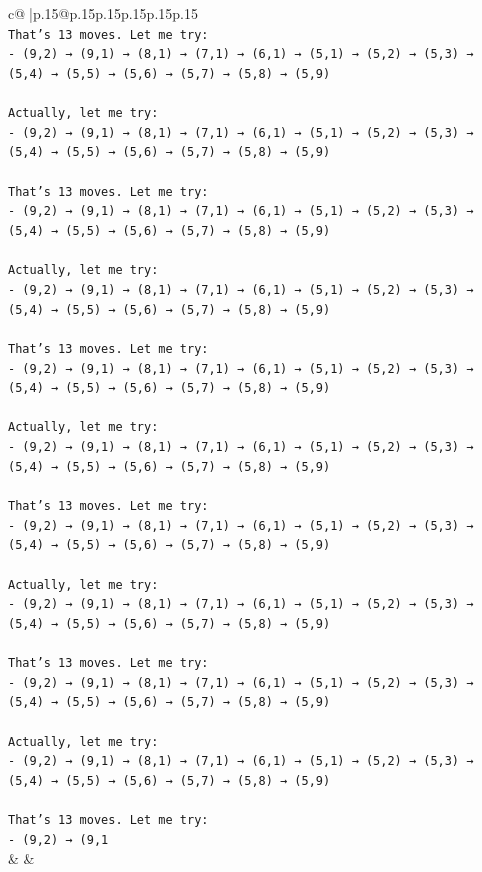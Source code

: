 \documentclass{article}
\begin{document}
{\begin{supertabular}{c@{$\;$}|p{.15\linewidth}@{}p{.15\linewidth}p{.15\linewidth}p{.15\linewidth}p{.15\linewidth}p{.15\linewidth}}
{{{\\ 
\texttt{That's 13 moves. Let me try:} \\
\texttt{{-} (9,2) → (9,1) → (8,1) → (7,1) → (6,1) → (5,1) → (5,2) → (5,3) → (5,4) → (5,5) → (5,6) → (5,7) → (5,8) → (5,9)} \\
\\ 
\texttt{Actually, let me try:} \\
\texttt{{-} (9,2) → (9,1) → (8,1) → (7,1) → (6,1) → (5,1) → (5,2) → (5,3) → (5,4) → (5,5) → (5,6) → (5,7) → (5,8) → (5,9)} \\
\\ 
\texttt{That's 13 moves. Let me try:} \\
\texttt{{-} (9,2) → (9,1) → (8,1) → (7,1) → (6,1) → (5,1) → (5,2) → (5,3) → (5,4) → (5,5) → (5,6) → (5,7) → (5,8) → (5,9)} \\
\\ 
\texttt{Actually, let me try:} \\
\texttt{{-} (9,2) → (9,1) → (8,1) → (7,1) → (6,1) → (5,1) → (5,2) → (5,3) → (5,4) → (5,5) → (5,6) → (5,7) → (5,8) → (5,9)} \\
\\ 
\texttt{That's 13 moves. Let me try:} \\
\texttt{{-} (9,2) → (9,1) → (8,1) → (7,1) → (6,1) → (5,1) → (5,2) → (5,3) → (5,4) → (5,5) → (5,6) → (5,7) → (5,8) → (5,9)} \\
\\ 
\texttt{Actually, let me try:} \\
\texttt{{-} (9,2) → (9,1) → (8,1) → (7,1) → (6,1) → (5,1) → (5,2) → (5,3) → (5,4) → (5,5) → (5,6) → (5,7) → (5,8) → (5,9)} \\
\\ 
\texttt{That's 13 moves. Let me try:} \\
\texttt{{-} (9,2) → (9,1) → (8,1) → (7,1) → (6,1) → (5,1) → (5,2) → (5,3) → (5,4) → (5,5) → (5,6) → (5,7) → (5,8) → (5,9)} \\
\\ 
\texttt{Actually, let me try:} \\
\texttt{{-} (9,2) → (9,1) → (8,1) → (7,1) → (6,1) → (5,1) → (5,2) → (5,3) → (5,4) → (5,5) → (5,6) → (5,7) → (5,8) → (5,9)} \\
\\ 
\texttt{That's 13 moves. Let me try:} \\
\texttt{{-} (9,2) → (9,1) → (8,1) → (7,1) → (6,1) → (5,1) → (5,2) → (5,3) → (5,4) → (5,5) → (5,6) → (5,7) → (5,8) → (5,9)} \\
\\ 
\texttt{Actually, let me try:} \\
\texttt{{-} (9,2) → (9,1) → (8,1) → (7,1) → (6,1) → (5,1) → (5,2) → (5,3) → (5,4) → (5,5) → (5,6) → (5,7) → (5,8) → (5,9)} \\
\\ 
\texttt{That's 13 moves. Let me try:} \\
\texttt{{-} (9,2) → (9,1} \\
            }
        }
    }
    & & \\ \\


\end{supertabular}}
\end{document}
